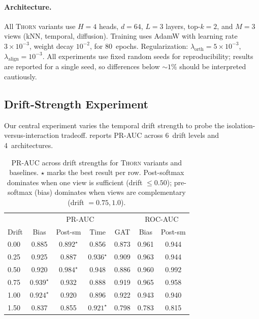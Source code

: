 \documentclass[11pt,a4paper]{article}
\newcommand{\thorn}{\textsc{Thorn}}
\begin{document}
\paragraph{Architecture.}
All \thorn{} variants use $H = 4$ heads, $d = 64$, $L = 3$ layers,
top-$k = 2$, and $M = 3$ views (kNN, temporal, diffusion).
Training uses AdamW with learning rate $3 \times 10^{-3}$,
weight decay $10^{-2}$, for 80~epochs.
Regularization: $\lambda_{\mathrm{orth}} = 5 \times 10^{-3}$,
$\lambda_{\mathrm{align}} = 10^{-3}$.
All experiments use fixed random seeds for reproducibility;
results are reported for a single seed, so differences below
$\sim\!1\%$ should be interpreted cautiously.

\subsection{Drift-Strength Experiment}
\label{sec:drift}

Our central experiment varies the temporal drift strength to probe the
isolation-versus-interaction tradeoff.
 reports PR-AUC across 6~drift levels and
4~architectures.

\begin{table}[t]
\centering
\caption{PR-AUC across drift strengths for \thorn{} variants and
baselines.
$\star$ marks the best result per row.
Post-softmax dominates when one view is sufficient (drift $\le 0.50$);
pre-softmax (bias) dominates when views are complementary
(drift $= 0.75, 1.0$).}
\label{tab:drift}
\begin{tabular}{@{}lcccc|cc@{}}
\toprule
 & \multicolumn{4}{c|}{PR-AUC} & \multicolumn{2}{c}{ROC-AUC} \\
Drift & Bias & Post-sm & Time & GAT & Bias & Post-sm \\
\midrule
0.00 & 0.885 & $\mathbf{0.892}^\star$ & 0.856 & 0.873 & 0.961 & 0.944 \\
0.25 & 0.925 & 0.887 & $\mathbf{0.936}^\star$ & 0.909 & 0.963 & 0.944 \\
0.50 & 0.920 & $\mathbf{0.984}^\star$ & 0.948 & 0.886 & 0.960 & 0.992 \\
0.75 & $\mathbf{0.939}^\star$ & 0.932 & 0.888 & 0.919 & 0.965 & 0.958 \\
1.00 & $\mathbf{0.924}^\star$ & 0.920 & 0.896 & 0.922 & 0.943 & 0.940 \\
1.50 & 0.837 & 0.855 & $\mathbf{0.921}^\star$ & 0.798 & 0.783 & 0.815 \\
\bottomrule
\end{tabular}
\end{table}
\end{document}
